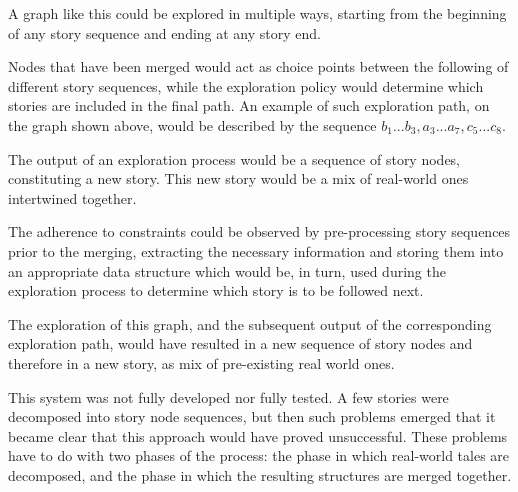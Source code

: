 \documentclass[12pt,a4paper,oneside]{report}
\begin{document}
A graph like this could be explored in multiple ways, starting from the beginning of any story sequence and ending at any story end. 

Nodes that have been merged would act as choice points between the following of different story sequences, while the exploration policy would determine which stories are included in the final path. An example of such exploration path, on the graph shown above, would be described by the sequence \(b_1...b_3,a_3...a_7,c_5...c_8\).

The output of an exploration process would be a sequence of story nodes, constituting a new story. This new story would be a mix of real-world ones intertwined together. 

\bigskip

The adherence to constraints could be observed by pre-processing story sequences prior to the merging, extracting the necessary information and storing them into an appropriate data structure which would be, in turn, used during the exploration process to determine which story is to be followed next.

\bigskip

The exploration of this graph, and the subsequent output of the corresponding exploration path, would have resulted in a new sequence of story nodes and therefore in a new story, as mix of pre-existing real world ones.

\bigskip

This system was not fully developed nor fully tested. A few stories were decomposed into story node sequences, but then such problems emerged that it became clear that this approach would have proved unsuccessful. These problems have to do with two phases of the process: the phase in which real-world tales are decomposed, and the phase in which the resulting structures are merged together.
\end{document}
